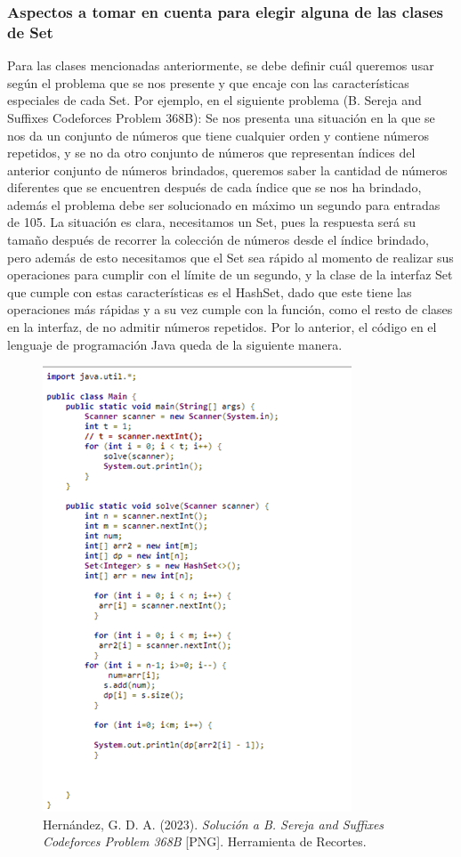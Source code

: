 \documentclass{report}
\begin{document}
\subsubsection{Aspectos a tomar en cuenta para elegir alguna de las clases de Set}
Para las clases mencionadas anteriormente, se debe definir cuál queremos usar según el problema que se nos presente y que encaje con las características especiales de cada Set. Por ejemplo, en el siguiente problema (B. Sereja and Suffixes Codeforces Problem 368B):
Se nos presenta una situación en la que se nos da un conjunto de números que tiene cualquier orden y contiene números repetidos, y se no da otro conjunto de números que representan índices del anterior conjunto de números brindados, queremos saber la cantidad de números diferentes que se encuentren después de cada índice que se nos ha brindado, además el problema debe ser solucionado en máximo un segundo para entradas de 105.
La situación es clara, necesitamos un Set, pues la respuesta será su tamaño después de recorrer la colección de números desde el índice brindado, pero además de esto necesitamos que el Set sea rápido al momento de realizar sus operaciones para cumplir con el límite de un segundo, y la clase de la interfaz Set que cumple con estas características es el HashSet, dado que este tiene las operaciones más rápidas y a su vez cumple con la función, como el resto de clases en la interfaz, de no admitir números repetidos. Por lo anterior, el código en el lenguaje de programación Java queda de la siguiente manera.
\begin{figure}[h]
    \centering
    \includegraphics[width=0.5\linewidth]{Imagen1.png}
    \caption{
Hernández, G. D. A. (2023). \textit{Solución a B. Sereja and Suffixes Codeforces Problem 368B} [PNG]. Herramienta de Recortes.}
\end{figure}
\end{document}
